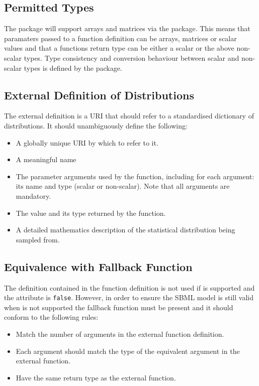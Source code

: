 \documentclass[draftspec]{sbmlpkgspec}
\begin{document}
\subsection{Permitted Types}

The \distrib package will support arrays and matrices via the \arrays
package. This means that paramaters passed to a function definition
can be arrays, matrices or scalar values and that a functions return
type can be either a scalar or the above non-scalar types. Type
consistency and conversion behaviour between scalar and non-scalar
types is defined by the \arrays package.

\subsection{External Definition of Distributions}
\label{sec:extlDefnDistn}

The external definition is a URI that should refer to a standardised
dictionary of distributions. It should unambiguously define the
following:

\begin{itemize}
\item A globally unique URI by which to refer to it.
\item A meaningful name
\item The parameter arguments used by the function, including for each
 argument: its name and type (scalar or non-scalar). Note that all
 arguments are mandatory.
\item The value and its type returned by the function.
\item A detailed mathematics description of the statistical distribution being
  sampled from.
\end{itemize}

\subsection{Equivalence with Fallback Function}

The \mathml definition contained in the function definition is not
used if \distribshort is supported and the  attribute
is \texttt{false}. However, in order to ensure the SBML model is still
valid when \distribshort is not supported the fallback function must
be present and it should conform to the following rules:

\begin{itemize}
\item Match the number of arguments in the external function
  definition.
\item Each argument should match the type of the equivalent argument
  in the external function.
\item Have the same return type as the external function.
\end{itemize}
\end{document}

